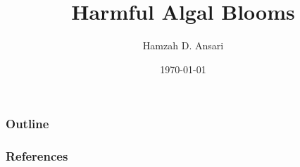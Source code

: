 \documentclass{beamer}
\title{Harmful Algal Blooms}
\author{Hamzah D. Ansari}
\institute{Oakland University}
\date{\today}
\begin{document}
\renewcommand{\footnotesize}{\tiny}

\begin{frame} 
\titlepage
\end{frame}

\begin{frame}
	\frametitle{Outline}
	\tableofcontents
\end{frame}



\begin{frame}[allowframebreaks]
	\frametitle{References}
	\printbibliography
\end{frame}
\end{document}
